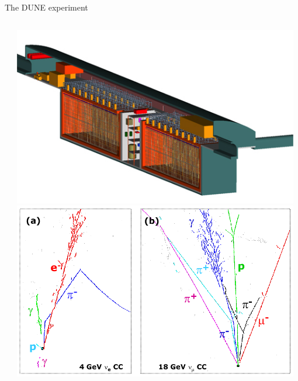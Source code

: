 \begin{frame}{The DUNE experiment}
\begin{columns}
\begin{column}{0.50\textwidth}
\begin{itemize}
{   }
   \end{itemize}
  \end{column}
  \begin{column}{0.50\textwidth}
    \includegraphics[width=0.98\textwidth]{./images/3nu/accelerator/lbne_doublecryo_schematic.jpg}\\
    \includegraphics[width=0.98\textwidth]{./images/3nu/accelerator/lar_display.png}\\
  \end{column}
\end{columns}
\end{frame}



